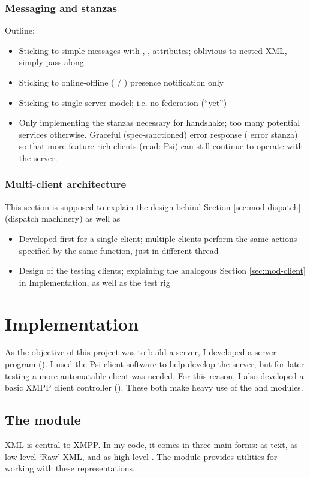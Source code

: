 \documentclass[12pt,a4paper,twoside,openright]{report}
\begin{document}
{\subsection{Messaging and stanzas}
Outline:
\begin{itemize}
  \item Sticking to simple messages with , ,  attributes; oblivious to nested XML, simply pass along
  \item Sticking to online-offline ( / ) presence notification only
  \item Sticking to single-server model; i.e. no federation (``yet'')
  \item Only implementing the  stanzas necessary for handshake; too many potential services otherwise. Graceful (spec-sanctioned) error response ( error stanza) so that more feature-rich clients (read: Psi) can still continue to operate with the server.
\end{itemize}

\subsection{Multi-client architecture}
This section is supposed to explain the design behind Section \ref{sec:mod-dispatch} (dispatch machinery) as well as
\begin{itemize}
  \item Developed first for a single client; multiple clients perform the same actions specified by the same function, just in  different thread
  \item Design of the testing clients; explaining the analogous Section \ref{sec:mod-client} in Implementation, as well as the test rig
\end{itemize}


\chapter{Implementation}
As the objective of this project was to build a server, I developed a server program (). I used the Psi client software to help develop the server, but for later testing a more automatable client was needed. For this reason, I also developed a basic XMPP client controller ().
These both make heavy use of the  and  modules.

\section{The  module}\label{sec:xmlmod}
XML is central to XMPP. In my code, it comes in three main forms: as text, as low-level `Raw' XML, and as high-level . The  module provides utilities for working with these representations.

}
\end{document}
